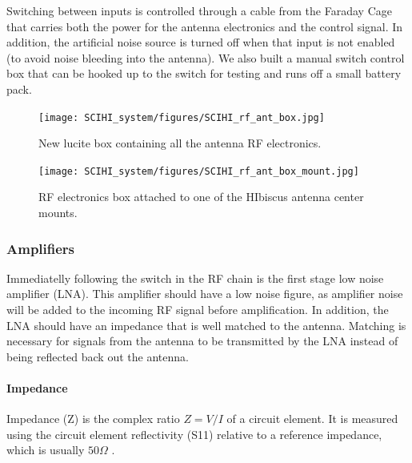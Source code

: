 Switching between inputs is controlled through a cable from the Faraday Cage that carries both the power for the antenna electronics and the control signal. In addition, the artificial noise source is turned off when that input is not enabled (to avoid noise bleeding into the antenna). We also built a manual switch control box that can be hooked up to the switch for testing and runs off a small battery pack. 

\begin{figure}[htb]
\centering
\begin{minipage}[b]{0.47\textwidth}
\centering
\texttt{[image: SCIHI\_system/figures/SCIHI\_rf\_ant\_box.jpg]}
\caption{New lucite box containing all the antenna RF electronics.}
\label{Fig:rf_ant_box}
\end{minipage}%
\begin{minipage}[b]{0.02\textwidth}
\hspace{1cm}
\end{minipage}%
\begin{minipage}[b]{0.47\textwidth}
\centering
\texttt{[image: SCIHI\_system/figures/SCIHI\_rf\_ant\_box\_mount.jpg]}
\caption{RF electronics box attached to one of the HIbiscus antenna center mounts.}
\label{Fig:rf_ant_mount}
\end{minipage}
\end{figure}

\subsubsection{Amplifiers} \label{Sec:Amp}

Immediatelly following the switch in the RF chain is the first stage low noise amplifier (LNA). This amplifier should have a low noise figure, as amplifier noise will be added to the incoming RF signal before amplification. In addition, the LNA should have an impedance that is well matched to the antenna. Matching is necessary for signals from the antenna to be transmitted by the LNA instead of being reflected back out the antenna. 

\paragraph{Impedance} 

Impedance (Z) is the complex ratio $Z = V/I$ of a circuit element. It is measured using the circuit element reflectivity (S11) relative to a reference impedance, which is usually $50 \Omega$ \cite{stutzman1981}.

